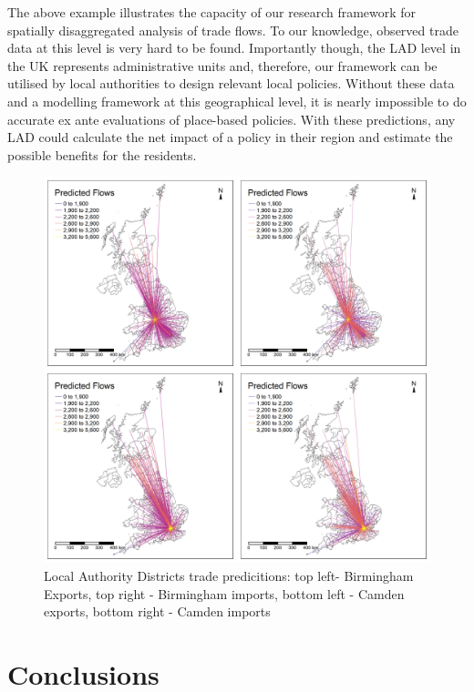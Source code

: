 \documentclass[]{interact}
\theoremstyle{plain}%
\theoremstyle{definition}
\theoremstyle{remark}
\begin{document}
The above example illustrates the capacity of our research framework for
spatially disaggregated analysis of trade flows. To our knowledge,
observed trade data at this level is very hard to be found. Importantly
though, the LAD level in the UK represents administrative units and,
therefore, our framework can be utilised by local authorities to design
relevant local policies. Without these data and a modelling framework at
this geographical level, it is nearly impossible to do accurate ex ante
evaluations of place-based policies. With these predictions, any LAD
could calculate the net impact of a policy in their region and estimate
the possible benefits for the residents.

\begin{figure}[p]
\includegraphics[width=1\linewidth]{figures/Predictions} \caption{\label{LAD_Maps}Local Authority Districts trade predicitions: top left- Birmingham Exports, top right - Birmingham imports, bottom left - Camden exports, bottom right - Camden imports}\label{fig:unnamed-chunk-15}
\end{figure}

\hypertarget{sec:6}{%
\section{Conclusions}\label{sec:6}}
\end{document}
